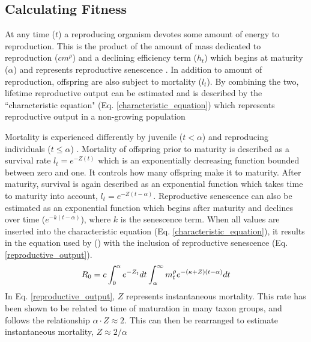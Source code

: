 \documentclass[a4paper, 11pt, hidelinks]{article} %
\begin{document}
	
	
	\subsection{Calculating Fitness}
	At any time ($ t $) a reproducing organism devotes some amount of energy to reproduction.  This is the product of the amount of mass dedicated to reproduction ($ cm^\rho $) and a declining efficiency term ($ h_t $) which begins at maturity ($ \alpha $) and represents reproductive senescence \parencite{Benoit2018, Vrtilek2018, Stearns2000}.  In addition to amount of reproduction, offspring are also subject to mortality ($ l_t $).  By combining the two, lifetime reproductive output can be estimated and is described by the ``characteristic equation" (Eq. \ref{characteristic_equation}) which represents reproductive output in a non-growing population \parencite{Tsoukali2016, roff1993, Roff2001, stearns1992evolution, Arendt2011, Roff1986, Roff1984}

	Mortality is experienced differently by juvenile ($ t < \alpha $) and reproducing individuals ($ t \leq \alpha $) \parencite{Day1997}. 
	Mortality of offspring prior to maturity is described as a survival rate $ l_t = e^{-Z(t)} $ which is an exponentially decreasing function bounded between zero and one.  It controls how many offspring make it to maturity.  After maturity, survival is again described as an exponential function which takes time to maturity into account, $ l_t = e^{-Z(t-\alpha)} $.  
	Reproductive senescence can also be estimated as an exponential function which begins after maturity and declines over time  ($ e^{-k(t-\alpha)} $), where $ k $ is the senescence term.  When all values are inserted into the characteristic equation (Eq. \ref{characteristic_equation}), it results in the equation used by \citeauthor{Charnov2001} (\citeyear{Charnov2001}) with the inclusion of reproductive senescence (Eq. \ref{reproductive_output}).
	\begin{equation}
		\label{reproductive_output}
		R_0 = c\int_0^\alpha e^{-Z_t} dt  \int_\alpha^\infty m_t^\rho e^{-(\kappa + Z)(t - \alpha)}dt\\
	\end{equation} 
	In Eq. \ref{reproductive_output}, $ Z $ represents instantaneous mortality.  This rate has been shown to be related to time of maturation in many taxon groups, and follows the relationship $ \alpha \cdot Z \approx  2$.  This can then be rearranged to estimate instantaneous mortality, $ Z \approx 2/\alpha  $
	
\end{document}
